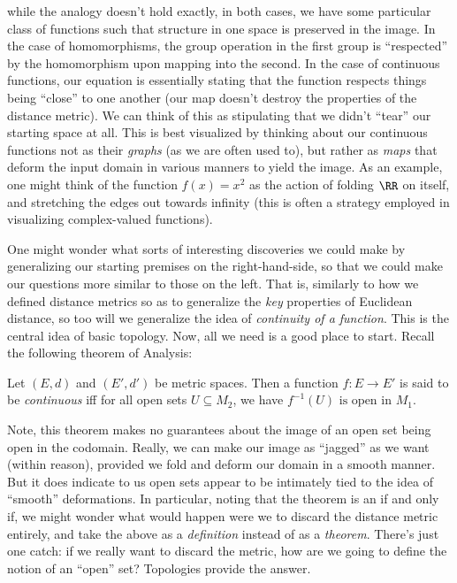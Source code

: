 \documentclass{fkbook}
\theoremstyle{snazzydefinition}
\begin{document}
\begin{adjustwidth}{1em}{1em}
  while the analogy doesn't hold exactly, in both cases, we have some
  particular class of functions such that structure in one space is
  preserved in the image. In the case of homomorphisms, the group
  operation in the first group is ``respected'' by the homomorphism
  upon mapping into the second. In the case of continuous functions,
  our equation is essentially stating that the function respects
  things being ``close'' to one another (our map doesn't destroy the
  properties of the distance metric). We can think of this as
  stipulating that we didn't ``tear'' our starting space at all. This
  is best visualized by thinking about our continuous functions not as
  their \emph{graphs} (as we are often used to), but rather as
  \emph{maps} that deform the input domain in various manners to yield
  the image. As an example, one might think of the function $f(x) =
  x^2$ as the action of folding $\RR$ on itself, and stretching the
  edges out towards infinity (this is often a strategy employed in
  visualizing complex-valued functions).

  One might wonder what sorts of interesting discoveries we could make
  by generalizing our starting premises on the right-hand-side, so
  that we could make our questions more similar to those on the left.
  That is, similarly to how we defined distance metrics so as to
  generalize the \emph{key} properties of Euclidean distance, so too
  will we generalize the idea of \emph{continuity of a function}. This
  is the central idea of basic topology. Now, all we need is a good
  place to start. Recall the following theorem of Analysis:
  \begin{theorem}
    Let $(E,d)$ and $(E', d')$ be metric spaces. Then a function $f :
    E \to E'$ is said to be \emph{continuous} iff for all open sets $U
    \subseteq M_2$, we have $f^{-1}(U) \text{ is open in } M_1$.
  \end{theorem}
  Note, this theorem makes no guarantees about the image of an open
  set being open in the codomain. Really, we can make our image as
  ``jagged'' as we want (within reason), provided we fold and deform
  our domain in a smooth manner. But it does indicate to us open sets
  appear to be intimately tied to the idea of ``smooth'' deformations.
  In particular, noting that the theorem is an if and only if, we
  might wonder what would happen were we to discard the distance
  metric entirely, and take the above as a \emph{definition} instead
  of as a \emph{theorem}. There's just one catch: if we really want to
  discard the metric, how are we going to define the notion of an
  ``open'' set? Topologies provide the answer.

\end{adjustwidth}
\end{document}

